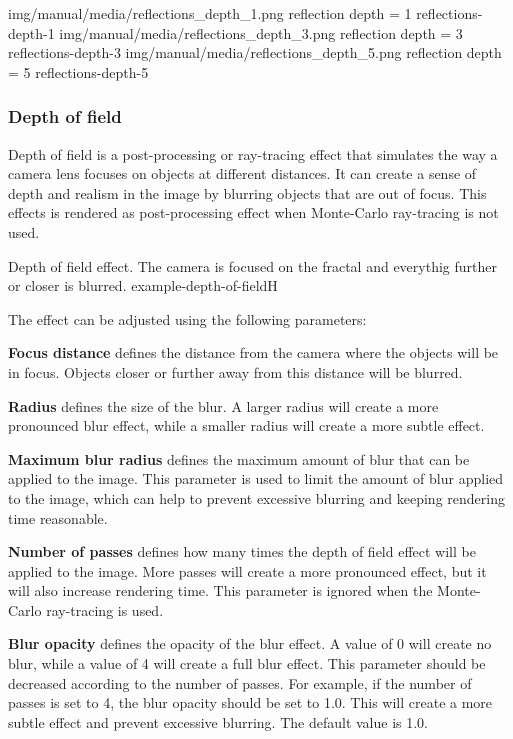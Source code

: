 \threeImagesWithTwoCaptionsFullWidth
{img/manual/media/reflections_depth_1.png}
{reflection depth = 1}
{reflections-depth-1}
{img/manual/media/reflections_depth_3.png}
{reflection depth = 3}
{reflections-depth-3}
{img/manual/media/reflections_depth_5.png}
{reflection depth = 5}
{reflections-depth-5}

\subsubsection{Depth of field}\label{effects-ray-tracing-dof}

Depth of field is a post-processing or ray-tracing effect that simulates the way a camera lens focuses on objects at different distances. It can create a sense of depth and realism in the image by blurring objects that are out of focus. This effects is rendered as post-processing effect when Monte-Carlo ray-tracing is not used. 

{Depth of field effect. The camera is focused on the fractal and everythig further or closer is blurred.}
{example-depth-of-field}{H}

The effect can be adjusted using the following parameters:

\textbf{Focus distance} defines the distance from the camera where the objects will be in focus. Objects closer or further away from this distance will be blurred.

\textbf{Radius} defines the size of the blur. A larger radius will create a more pronounced blur effect, while a smaller radius will create a more subtle effect.

\textbf{Maximum blur radius} defines the maximum amount of blur that can be applied to the image. This parameter is used to limit the amount of blur applied to the image, which can help to prevent excessive blurring and keeping rendering time reasonable.

\textbf{Number of passes} defines how many times the depth of field effect will be applied to the image. More passes will create a more pronounced effect, but it will also increase rendering time. This parameter is ignored when the Monte-Carlo ray-tracing is used.

\textbf{Blur opacity} defines the opacity of the blur effect. A value of 0 will create no blur, while a value of 4 will create a full blur effect. This parameter should be decreased according to the number of passes. For example, if the number of passes is set to 4, the blur opacity should be set to 1.0. This will create a more subtle effect and prevent excessive blurring. The default value is 1.0.


